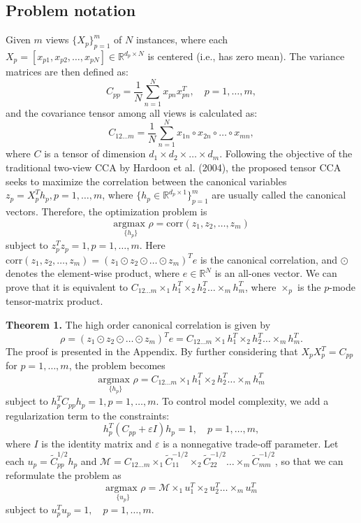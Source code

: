 \documentclass[a4paper,14pt]{article}
\renewcommand{\epsilon}{\ensuremath{\varepsilon}}
\theoremstyle{plain} %
\theoremstyle{definition} %
\theoremstyle{remark} %
\theoremstyle{definition}
\theoremstyle{remark}
\theoremstyle{remark}
\begin{document}
	\subsection{Problem notation}
	
	Given $m$ views $\{X_p\}_{p=1}^m$ of $N$ instances, where each $X_p = [x_{p1}, x_{p2}, \dots, x_{pN}] \in \mathbb{R}^{d_p \times N}$ is centered (i.e., has zero mean). The variance matrices are then defined as:
	\[
	C_{pp} = \frac{1}{N} \sum_{n=1}^N x_{pn} x_{pn}^T, \quad p = 1, \dots, m,
	\]
	and the covariance tensor among all views is calculated as:
	\[
	C_{12\ldots m} = \frac{1}{N} \sum_{n=1}^N x_{1n} \circ x_{2n} \circ \dots \circ x_{mn},
	\]
	where $C$ is a tensor of dimension $d_1 \times d_2 \times \dots \times d_m$. Following the objective of the traditional two-view CCA by Hardoon et al. (2004), the proposed tensor CCA seeks to maximize the correlation between the canonical variables $z_p = X_p^T h_p, p = 1, \dots, m$, where $\{h_p \in \mathbb{R}^{d_p \times 1}\}_{p=1}^m$ are usually called the canonical vectors. Therefore, the optimization problem is
	\[
	\underset{\{h_p\}}{\text{argmax }} \rho = \text{corr}(z_1, z_2, \dots, z_m)
	\]
	subject to $z_p^T z_p = 1, p = 1, \dots, m$.
	Here $\text{corr}(z_1, z_2, \dots, z_m) = (z_1 \odot z_2 \odot \dots \odot z_m)^T e$ is the canonical correlation, and $\odot$ denotes the element-wise product, where $e \in \mathbb{R}^N$ is an all-ones vector. We can prove that it is equivalent to $C_{12\ldots m} \times_1 h_1^T \times_2 h_2^T \dots \times_m h_m^T$, where $\times_p$ is the $p$-mode tensor-matrix product.
	
	\textbf{Theorem 1.} The high order canonical correlation is given by
	\[
	\rho = (z_1 \odot z_2 \odot \dots \odot z_m)^T e = C_{12\ldots m} \times_1 h_1^T \times_2 h_2^T \dots \times_m h_m^T.
	\]
	The proof is presented in the Appendix. By further considering that $X_p X_p^T = C_{pp}$ for $p = 1, \dots, m$, the problem becomes
	\[
	\underset{\{h_p\}}{\text{argmax }} \rho = C_{12\ldots m} \times_1 h_1^T \times_2 h_2^T \dots \times_m h_m^T
	\]
	subject to $h_p^T C_{pp} h_p = 1, p = 1, \dots, m$.
	To control model complexity, we add a regularization term to the constraints:
	\[
	h_p^T (C_{pp} + \epsilon I) h_p = 1, \quad p = 1, \dots, m,
	\]
	where $I$ is the identity matrix and $\epsilon$ is a nonnegative trade-off parameter. Let each $u_p = \tilde{C}_{pp}^{1/2} h_p$ and $\mathcal{M} = C_{12\ldots m} \times_1 \tilde{C}_{11}^{-1/2} \times_2 \tilde{C}_{22}^{-1/2} \dots \times_m \tilde{C}_{mm}^{-1/2}$, so that we can reformulate the problem as
	\[
	\underset{\{u_p\}}{\text{argmax }} \rho = \mathcal{M} \times_1 u_1^T \times_2 u_2^T \dots \times_m u_m^T
	\]
	subject to $u_p^T u_p = 1, \quad p = 1, \dots, m$.
	
\end{document}
